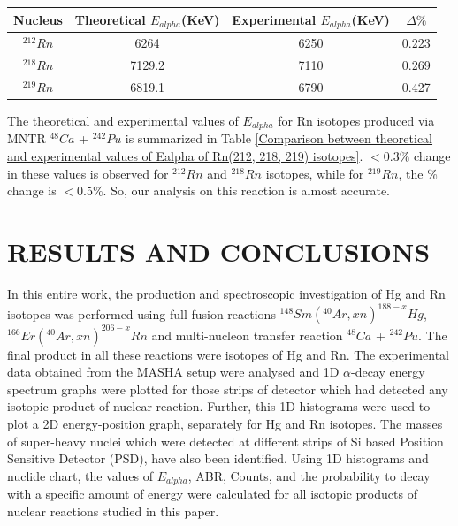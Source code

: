 \documentclass[12pt]{article}
\begin{document}
\begin{center}
\begin{tabular}{|c|c|c|c|}
\hline
Nucleus & Theoretical $E_{alpha}$(KeV) & Experimental $E_{alpha}$(KeV) & $\Delta\%$ \\
\hline
\hline
$^{212}Rn$ & 6264 & 6250 & 0.223 \\
\hline
$^{218}Rn$ & 7129.2 & 7110 & 0.269 \\
\hline
$^{219}Rn$ & 6819.1 & 6790 & 0.427 \\
\hline
\end{tabular}
\label{Comparison between theoretical and experimental values of Ealpha of Rn(212, 218, 219) isotopes}
\end{center}

The theoretical and experimental values of $E_{alpha}$ for Rn isotopes produced via MNTR $^{48}Ca$ + $^{242}Pu$ is summarized in Table \ref{Comparison between theoretical and experimental values of Ealpha of Rn(212, 218, 219) isotopes}. $<0.3\%$ change in these values is observed for $^{212}Rn$ and $^{218}Rn$ isotopes, while for $^{219}Rn$, the \% change is $<0.5\%$. So, our analysis on this reaction is almost accurate.


\section{RESULTS AND CONCLUSIONS}
In this entire work, the production and spectroscopic investigation of Hg and Rn isotopes was performed using full fusion reactions $^{148}Sm(^{40}Ar,xn)^{188-x}Hg$, $^{166}Er(^{40}Ar,xn)^{206-x}Rn$  and multi-nucleon transfer reaction $^{48}Ca$ + $^{242}Pu$. The final product in all these reactions were isotopes of Hg and Rn. The experimental data obtained from the MASHA setup were analysed and 1D $\alpha$-decay energy spectrum graphs were plotted for those strips of detector which had detected any isotopic product of nuclear reaction. Further, this 1D histograms were used to plot a 2D energy-position graph, separately for Hg and Rn isotopes. The masses of super-heavy nuclei which were detected at different strips of Si based Position Sensitive Detector (PSD), have also been identified. Using 1D histograms and nuclide chart, the values of $E_{alpha}$, ABR, Counts, and the probability to decay with a specific amount of energy were calculated for all isotopic products of nuclear reactions studied in this paper.




\end{document}

